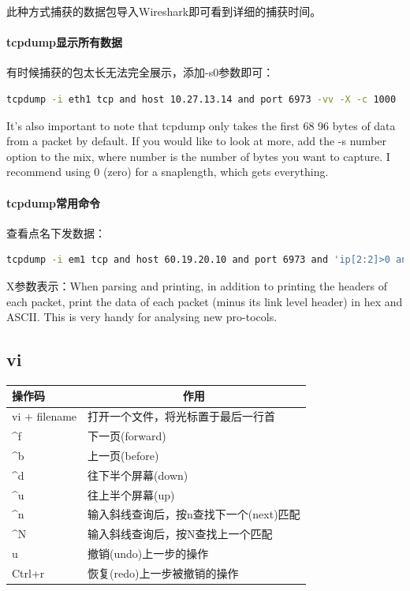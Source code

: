 \documentclass{book}
\begin{document}
此种方式捕获的数据包导入Wireshark即可看到详细的捕获时间。

\paragraph{tcpdump显示所有数据}

有时候捕获的包太长无法完全展示，添加-s0参数即可：

\begin{lstlisting}[language=Bash]
tcpdump -i eth1 tcp and host 10.27.13.14 and port 6973 -vv -X -c 1000
\end{lstlisting}

It’s also important to note that tcpdump only takes the first 68 96 bytes of data from a packet by default. 
If you would like to look at more, add the -s number option to the mix, where number is the number of bytes you want to capture. 
I recommend using 0 (zero) for a snaplength, which gets everything. 

\paragraph{tcpdump常用命令}

查看点名下发数据：

\begin{lstlisting}[language=Bash]
tcpdump -i em1 tcp and host 60.19.20.10 and port 6973 and 'ip[2:2]>0 and ip[41:2]=0x8201' -vv -X -c 100
\end{lstlisting}

X参数表示：When parsing and printing, 
in addition to printing the headers of each packet, 
print the data of each packet (minus its link level header) in hex and ASCII.  
This is very handy for analysing new pro-tocols.

\subsection{vi}

\begin{tabular}{l|p{10cm}}
	\multirow{1}{*}{操作码}			
	& \multicolumn{1}{c}{作用}\\	 
	\hline
	vi + filename & 打开一个文件，将光标置于最后一行首\\
	\hline
	\textasciicircum f & 下一页(forward)\\
	\hline 
	\textasciicircum b & 上一页(before)\\
	\hline
	\textasciicircum d & 往下半个屏幕(down)\\
	\hline
	\textasciicircum u & 往上半个屏幕(up)\\
	\hline
	\textasciicircum n & 输入斜线查询后，按n查找下一个(next)匹配\\
	\hline
	\textasciicircum N & 输入斜线查询后，按N查找上一个匹配\\
	\hline
	u & 撤销(undo)上一步的操作\\
	\hline
	Ctrl+r & 恢复(redo)上一步被撤销的操作\\
	\hline
	\end{tabular}
\end{document}
